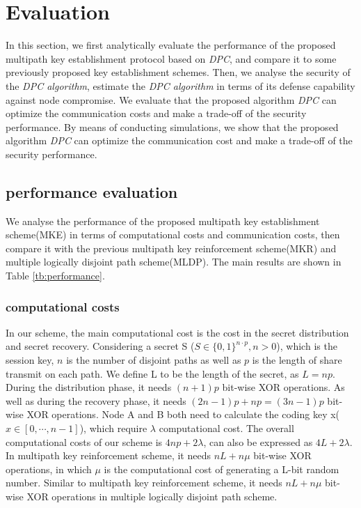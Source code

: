 \documentclass[nocopyrightspace,9pt]{sigplanconf}
\begin{document}
\section{Evaluation}
In this section, we first analytically evaluate the performance of the
proposed multipath key establishment protocol based on \textit{DPC}, and
compare it to some previously proposed key establishment schemes.
Then, we analyse the security of the \textit{DPC algorithm}, estimate the
\textit{DPC algorithm} in terms of its defense capability against node compromise.
We evaluate that the proposed algorithm \textit{DPC}
can optimize the communication costs and make a trade-off of the security performance.
By means of conducting simulations, we show that the proposed algorithm \textit{DPC}
can optimize the communication cost and make a trade-off of the security performance.
\subsection{performance evaluation}
We analyse the performance of the proposed multipath key establishment scheme(MKE)
in terms of computational costs and communication costs, then compare it with
the previous multipath key reinforcement scheme(MKR) and  multiple logically disjoint path scheme(MLDP).
The main results are shown in Table \ref{tb:performance}.

\subsubsection*{computational costs}
In our scheme, the main computational cost is the cost in the secret distribution and
secret recovery. Considering a secret S ($S\in\{0,1\}^{n\cdot p},n>0$), which is the session key,
$n$ is the number of disjoint paths as well as $p$ is the length of share transmit on each path.
We define L to be the length of the secret, as $L=np$.
During the distribution phase, it needs $(n+1)p$ bit-wise XOR operations. As well as during
the recovery phase, it needs $(2n-1)p+np=(3n-1)p$ bit-wise XOR operations. Node A and B both
need to calculate the
coding key x($x\in[0,\cdots ,n-1]$), which require $\lambda$ computational cost.
The overall computational costs of our scheme is $4np+2\lambda$, can also be expressed as $4L+2\lambda$.
In multipath key reinforcement scheme, it needs $nL+n\mu$ bit-wise XOR operations, in which $\mu$
is the computational cost of generating a L-bit random number.
Similar to multipath key reinforcement scheme, it needs $nL+n\mu$ bit-wise XOR operations in
multiple logically disjoint path scheme.\\
\end{document}
